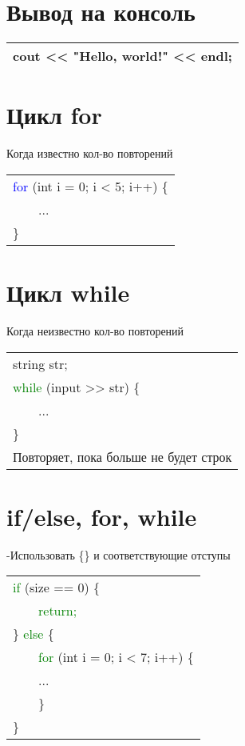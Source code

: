 \documentclass[12pt, letterpaper]{article}
\begin{document}
\section{Вывод на консоль}
\begin{flushleft}
\begin{tabular}{ |l| } 
\hline
cout << "Hello, world!" << endl;\\
\hline
\end{tabular}
\end{flushleft}
\section{Цикл for}
Когда известно кол-во повторений\\
\begin{flushleft}
\begin{tabular}{ |l| } 
\hline
\textcolor{blue}{for }(int i = 0; i < 5; i++) \{\\
\ \ \ \ ...\\
\}\\
\hline
\end{tabular}
\end{flushleft}
\section{Цикл while}
Когда неизвестно кол-во повторений\\
\begin{flushleft}
\begin{tabular}{ |l| } 
\hline
string str;\\
\textcolor{green}{while } (input >> str) \{\\
\ \ \ \ ...\\
\}\\
Повторяет, пока больше не будет строк\\
\hline
\end{tabular}
\end{flushleft}

\section{if/else, for, while}
-Использовать \{\} и соответствующие отступы\\
\begin{flushleft}
\begin{tabular}{ |l| } 
\hline
\textcolor{green}{if }(size == 0) \{\\
\ \ \ \ \textcolor{green}{return;}\\
\} \textcolor{green}{else } \{\\
\ \ \ \ \textcolor{green}{for }(int i = 0; i < 7; i++) \{\\
\ \ \ \ ...\\
\ \ \ \ \}\\
\}\\
\hline
\end{tabular}
\end{flushleft}
\end{document}
